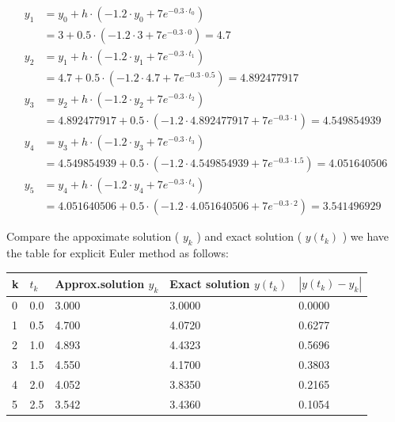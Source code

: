 \documentclass[a4paper]{article}
\numberwithin{equation}{section}
\begin{document}
\begin{align*}
  y_1 & = y_0 + h\cdot(-1.2\cdot y_0 + 7e^{-0.3\cdot t_0})                                     \\
      & = 3 + 0.5 \cdot(-1.2\cdot 3 + 7e^{-0.3\cdot 0}) =4.7                                                         \\
 y_2 & = y_1 + h\cdot(-1.2\cdot y_1 + 7e^{-0.3\cdot t_1})                                     \\
      & = 4.7 + 0.5 \cdot(-1.2\cdot 4.7 + 7e^{-0.3\cdot 0.5}) =4.892477917                                          \\
   y_3 & = y_2 + h\cdot(-1.2\cdot y_2 + 7e^{-0.3\cdot t_2})                                     \\
      & = 4.892477917  + 0.5 \cdot(-1.2\cdot 4.892477917  + 7e^{-0.3\cdot 1}) =4.549854939  
\\
 y_4 & = y_3 + h\cdot(-1.2\cdot y_3 + 7e^{-0.3\cdot t_3})                                     \\
      & = 4.549854939  + 0.5 \cdot(-1.2\cdot 4.549854939  + 7e^{-0.3\cdot 1.5}) =4.051640506 
      \\
       y_5 & = y_4 + h\cdot(-1.2\cdot y_4 + 7e^{-0.3\cdot t_4})                                     \\
     & = 4.051640506  + 0.5 \cdot(-1.2\cdot 4.051640506  + 7e^{-0.3\cdot 2}) =3.541496929  
\end{align*}

 Compare the appoximate solution ( \(y_k\) ) and exact solution  ( \(y(t_k)\) ) we have the  table for explicit Euler method as follows:
 
  \begin{table}[H]
 \centering
\begin{tabular}{|l|l|l|l|l|}
\hline
k & \(t_k\)  &  Approx.solution \(y_k\)       &  Exact solution \(y(t_k)\)     & \(|y(t_k)-y_k|\) \\ \hline
0 & 0.0 & 3.000 & 3.0000 & 0.0000   \\ \hline
1 & 0.5 & 4.700 & 4.0720 & 0.6277   \\ \hline
2 & 1.0 & 4.893 & 4.4323 & 0.5696   \\ \hline
3 & 1.5 & 4.550 & 4.1700 & 0.3803   \\ \hline
4 & 2.0 & 4.052 & 3.8350 & 0.2165   \\ \hline
5 & 2.5 & 3.542 & 3.4360 & 0.1054   \\ \hline
\end{tabular}
\end{table}
 
\end{document}
